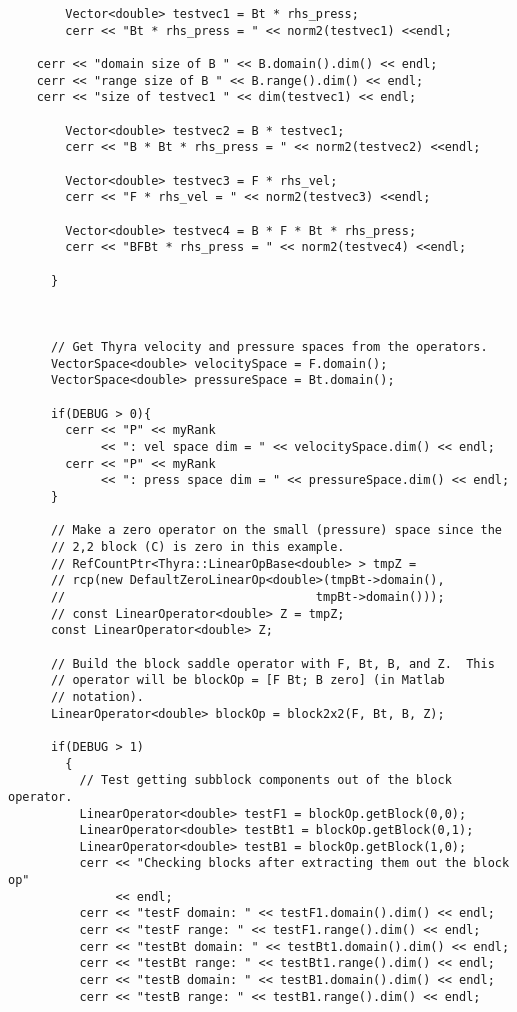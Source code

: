 \begin{verbatim}
        Vector<double> testvec1 = Bt * rhs_press;
        cerr << "Bt * rhs_press = " << norm2(testvec1) <<endl;

	cerr << "domain size of B " << B.domain().dim() << endl;
	cerr << "range size of B " << B.range().dim() << endl;
	cerr << "size of testvec1 " << dim(testvec1) << endl;

        Vector<double> testvec2 = B * testvec1;
        cerr << "B * Bt * rhs_press = " << norm2(testvec2) <<endl;

        Vector<double> testvec3 = F * rhs_vel;
        cerr << "F * rhs_vel = " << norm2(testvec3) <<endl;

        Vector<double> testvec4 = B * F * Bt * rhs_press;
        cerr << "BFBt * rhs_press = " << norm2(testvec4) <<endl;

      }



      // Get Thyra velocity and pressure spaces from the operators.
      VectorSpace<double> velocitySpace = F.domain();
      VectorSpace<double> pressureSpace = Bt.domain();

      if(DEBUG > 0){
        cerr << "P" << myRank 
             << ": vel space dim = " << velocitySpace.dim() << endl;
        cerr << "P" << myRank 
             << ": press space dim = " << pressureSpace.dim() << endl;
      }

      // Make a zero operator on the small (pressure) space since the
      // 2,2 block (C) is zero in this example.
      // RefCountPtr<Thyra::LinearOpBase<double> > tmpZ = 
      // rcp(new DefaultZeroLinearOp<double>(tmpBt->domain(), 
      //                                   tmpBt->domain()));
      // const LinearOperator<double> Z = tmpZ;
      const LinearOperator<double> Z;

      // Build the block saddle operator with F, Bt, B, and Z.  This
      // operator will be blockOp = [F Bt; B zero] (in Matlab
      // notation).
      LinearOperator<double> blockOp = block2x2(F, Bt, B, Z);

      if(DEBUG > 1) 
        {
          // Test getting subblock components out of the block operator.
          LinearOperator<double> testF1 = blockOp.getBlock(0,0);
          LinearOperator<double> testBt1 = blockOp.getBlock(0,1);
          LinearOperator<double> testB1 = blockOp.getBlock(1,0);
          cerr << "Checking blocks after extracting them out the block op"
               << endl;
          cerr << "testF domain: " << testF1.domain().dim() << endl;
          cerr << "testF range: " << testF1.range().dim() << endl;
          cerr << "testBt domain: " << testBt1.domain().dim() << endl;
          cerr << "testBt range: " << testBt1.range().dim() << endl;
          cerr << "testB domain: " << testB1.domain().dim() << endl;
          cerr << "testB range: " << testB1.range().dim() << endl;


\end{verbatim}
